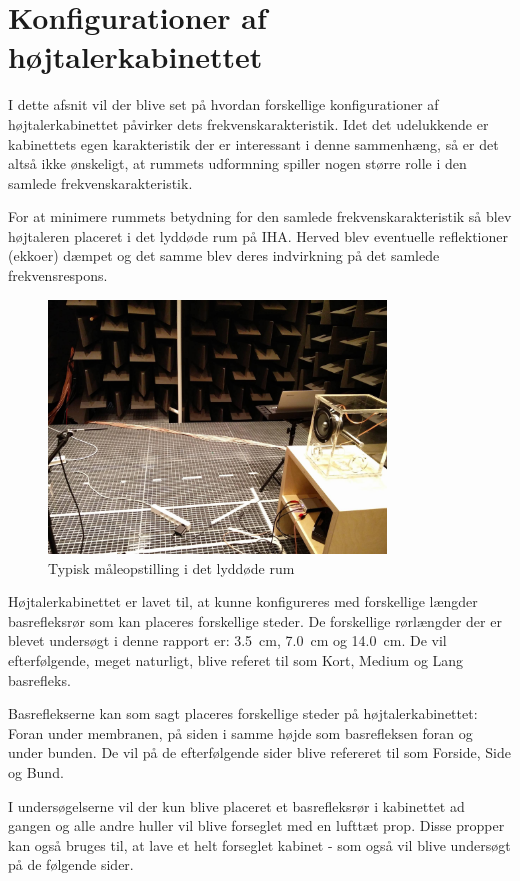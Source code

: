 \section{Konfigurationer af højtalerkabinettet}
I dette afsnit vil der blive set på hvordan forskellige konfigurationer af højtalerkabinettet påvirker dets frekvenskarakteristik. Idet det udelukkende er kabinettets egen karakteristik der er interessant i denne sammenhæng, så er det altså ikke ønskeligt, at rummets udformning spiller nogen større rolle i den samlede frekvenskarakteristik.

For at minimere rummets betydning for den samlede frekvenskarakteristik så blev højtaleren placeret i det lyddøde rum på IHA. Herved blev eventuelle reflektioner (ekkoer) dæmpet og det samme blev deres indvirkning på det samlede frekvensrespons.
\begin{figure}[H]
	\centering
	\includegraphics[width=0.8\textwidth]{Billeder/LyddodtRum}
	\caption{Typisk måleopstilling i det lyddøde rum}
\end{figure}

Højtalerkabinettet er lavet til, at kunne konfigureres med forskellige længder basrefleksrør som kan placeres forskellige steder. De forskellige rørlængder der er blevet undersøgt i denne rapport er: \SI{3,5}{\centi\meter}, \SI{7,0}{\centi\meter} og \SI{14,0}{\centi\meter}. De vil efterfølgende, meget naturligt, blive referet til som Kort, Medium og Lang basrefleks.

Basreflekserne kan som sagt placeres forskellige steder på højtalerkabinettet: Foran under membranen, på siden i samme højde som basrefleksen foran og under bunden. De vil på de efterfølgende sider blive refereret til som Forside, Side og Bund.

I undersøgelserne vil der kun blive placeret et basrefleksrør i kabinettet ad gangen og alle andre huller vil blive forseglet med en lufttæt prop. Disse propper kan også bruges til, at lave et helt forseglet kabinet - som også vil blive undersøgt på de følgende sider.



